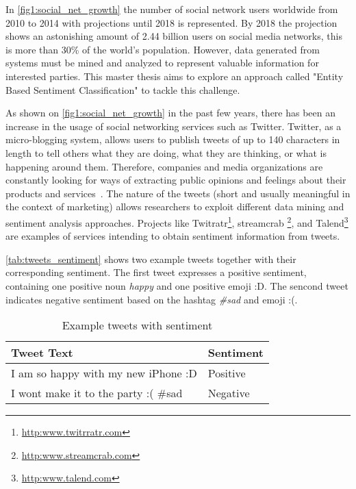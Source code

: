 In \autoref{fig1:social_net_growth} the number of social network users worldwide from 2010 to 2014 with projections until 2018 is represented. By 2018 the projection shows an astonishing amount of 2.44 billion users on social media networks, this is more than 30\% of the world's population. However, data generated from systems must be mined and analyzed to represent valuable information for interested parties. This master thesis aims to explore an approach called "Entity Based Sentiment Classification" to tackle this challenge.  

As shown on \autoref{fig1:social_net_growth} in the past few years, there has been an increase in the usage of social networking services such as Twitter. Twitter, as a micro-blogging system, allows users
to publish tweets of up to 140 characters in length to tell others what they are doing, what they are
thinking, or what is happening around them. Therefore, companies and media organizations are constantly looking for ways of extracting public opinions and feelings about their products and services~\cite{kouloumpis2011twitter}. The nature of the tweets (short and usually meaningful in the context of marketing) allows researchers to exploit different data mining and sentiment analysis approaches. Projects like Twitratr\footnote{\url{http:www.twitrratr.com}}, streamcrab \footnote{\url{http:www.streamcrab.com}}, and Talend\footnote{\url{http:www.talend.com}} are examples of services intending to obtain sentiment information from tweets.

\clearpage

\autoref{tab:tweets_sentiment} shows two example tweets together with their corresponding
sentiment. The first tweet expresses a positive sentiment, containing one positive noun \textit{happy} and one positive emoji :D. The sencond tweet indicates negative sentiment based on the hashtag \textit{\#sad } and emoji :(.

\begin{table}[H]
    \centering
    \caption{Example tweets with sentiment}
    \label{tab:tweets_sentiment}
    \begin{tabular}{l|l}
        \textbf{Tweet Text}                 & \textbf{Sentiment}                \\ \hline
        I am so {\color[HTML]{036400}happy} with my new iPhone {\color[HTML]{036400}:D} & {\color[HTML]{036400} Positive}   \\ \hline
        I wont make it to the party {\color[HTML]{CB0000}:(}  {\color[HTML]{CB0000}\#sad}  & {\color[HTML]{CB0000} Negative} \\ \hline
    \end{tabular}
\end{table}



